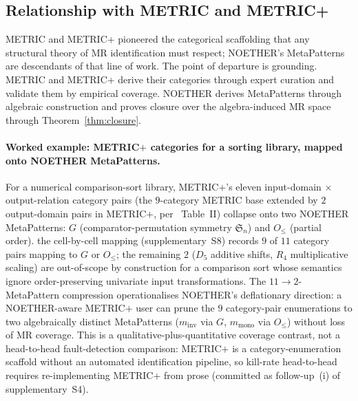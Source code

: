 \documentclass[acmsmall,screen,review]{acmart}
\begin{document}
\subsection{Relationship with METRIC and METRIC+}
\label{subsec:metricplus-relationship}

METRIC and METRIC+ pioneered the categorical scaffolding that any structural theory of MR identification must respect; NOETHER's MetaPatterns are descendants of that line of work. The point of departure is grounding. METRIC and METRIC+ derive their categories through expert curation and validate them by empirical coverage. NOETHER derives MetaPatterns through algebraic construction and proves closure over the algebra-induced MR space through Theorem~\ref{thm:closure}.

\paragraph{Worked example: METRIC$+$ categories for a sorting library, mapped onto NOETHER MetaPatterns.}
\label{para:metricplus-sorting}
For a numerical comparison-sort library, METRIC$+$'s eleven input-domain $\times$ output-relation category pairs (the $9$-category METRIC base extended by $2$ output-domain pairs in METRIC$+$, per~\cite{SunMETRICplus2021} Table~II) collapse onto two NOETHER MetaPatterns: $G$ (comparator-permutation symmetry $\mathfrak{S}_n$) and $O_{\le}$ (partial order). the cell-by-cell mapping (supplementary~S8) records $9$ of $11$ category pairs mapping to $G$ or $O_{\le}$; the remaining $2$ ($D_5$ additive shifts, $R_4$ multiplicative scaling) are out-of-scope by construction for a comparison sort whose semantics ignore order-preserving univariate input transformations. The $11 \to 2$-MetaPattern compression operationalises NOETHER's deflationary direction: a NOETHER-aware METRIC$+$ user can prune the $9$ category-pair enumerations to two algebraically distinct MetaPatterns ($m_{\mathrm{inv}}$ via $G$, $m_{\mathrm{mono}}$ via $O_{\le}$) without loss of MR coverage. This is a qualitative-plus-quantitative coverage contrast, not a head-to-head fault-detection comparison: METRIC$+$ is a category-enumeration scaffold without an automated identification pipeline, so kill-rate head-to-head requires re-implementing METRIC$+$ from prose (committed as follow-up~(i) of supplementary~S4).
\end{document}
